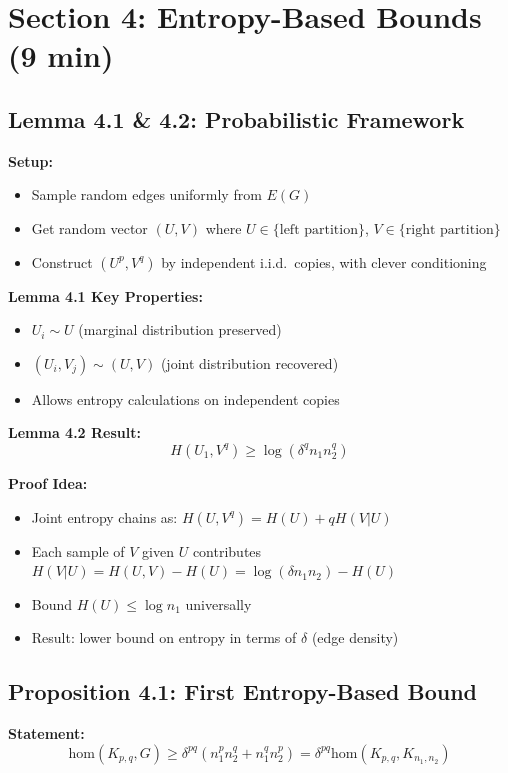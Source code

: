 \documentclass[12pt,a4paper]{article}
\begin{document}
\section{Section 4: Entropy-Based Bounds (9 min)}

\subsection{Lemma 4.1 \& 4.2: Probabilistic Framework}

\textbf{Setup:}
\begin{itemize}
    \item Sample random edges uniformly from $E(G)$
    \item Get random vector $(U,V)$ where $U \in \{\text{left partition}\}$, $V \in \{\text{right partition}\}$
    \item Construct $(U^p, V^q)$ by independent i.i.d.\ copies, with clever conditioning
\end{itemize}

\textbf{Lemma 4.1 Key Properties:}
\begin{itemize}
    \item $U_i \sim U$ (marginal distribution preserved)
    \item $(U_i, V_j) \sim (U,V)$ (joint distribution recovered)
    \item Allows entropy calculations on independent copies
\end{itemize}

\textbf{Lemma 4.2 Result:}
\[
H(U_1, V^q) \geq \log(\delta^q n_1 n_2^q)
\]

\textbf{Proof Idea:}
\begin{itemize}
    \item Joint entropy chains as: $H(U,V^q) = H(U) + qH(V|U)$
    \item Each sample of $V$ given $U$ contributes $H(V|U) = H(U,V) - H(U) = \log(\delta n_1 n_2) - H(U)$
    \item Bound $H(U) \leq \log n_1$ universally
    \item Result: lower bound on entropy in terms of $\delta$ (edge density)
\end{itemize}

\subsection{Proposition 4.1: First Entropy-Based Bound}

\textbf{Statement:}
\[
\text{hom}(K_{p,q}, G) \geq \delta^{pq}(n_1^p n_2^q + n_1^q n_2^p) = \delta^{pq} \text{hom}(K_{p,q}, K_{n_1,n_2})
\]
\end{document}
